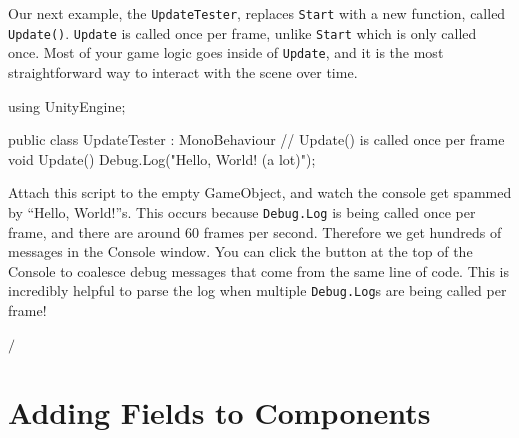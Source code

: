 \documentclass[11pt]{article}
\def\StartLineAt#1{\lstset{firstnumber=#1}}
\begin{document}
Our next example, the \lstinline|UpdateTester|, replaces \lstinline|Start| with a new function, called
\lstinline|Update()|.  \lstinline|Update| is called once per frame, unlike \lstinline|Start| which
is only called once.  Most of your game logic goes inside of \lstinline|Update|, and it is the most
straightforward way to interact with the scene over time.\pagebreak

\StartLineAt{1}
\begin{csharp}
using UnityEngine;

public class UpdateTester : MonoBehaviour
{
    // Update() is called once per frame
    void Update()
    {
        Debug.Log("Hello, World! (a lot)");
    }
}
\end{csharp}

Attach this script to the empty GameObject, and watch the console get spammed by ``Hello, World!''s.
This occurs because \lstinline|Debug.Log| is being called once per frame, and there are around 60
frames per second.  Therefore we get hundreds of messages in the Console window.
You can click the  button at the top of the Console to coalesce debug messages that
come from the same line of code.  This is incredibly helpful to parse the log when multiple
\lstinline|Debug.Log|s are being called per frame!
\begin{center}
 $\Big /$
\end{center}

\section{Adding Fields to Components}
\end{document}
